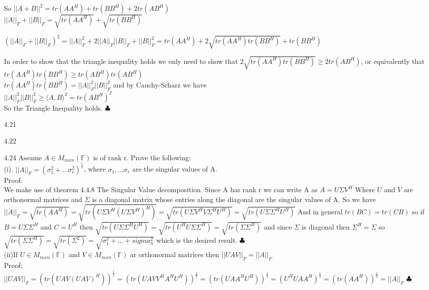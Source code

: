 \documentclass[12pt]{article}
\newenvironment{problems}{\begin{list}{}{\setlength{\labelwidth}{.7in}}}{\end{list}}
\begin{document}
\begin{problems}
So $||A+B||^2 = tr(AA^H) + tr(BB^H) + 2tr(AB^H)$\\

$||A||_F + ||B||_F = \sqrt{tr(AA^H)} + \sqrt{tr(BB^H)}$

$(||A||_F + ||B||_F)^2 = ||A||_F^2 +2||A||_F||B||_F + ||B||_F^2 = tr(AA^H)+ 2\sqrt{tr(AA^H)tr(BB^H)} + tr(BB^H)$ 

In order to show that the triangle inequality holds we only need to show that $2\sqrt{tr(AA^H)tr(BB^H)} \geq 2tr(AB^H) $, or equivalently that $tr(AA^H)tr(BB^H) \geq tr(AB^H)tr(AB^H)$ \\

$tr(AA^H)tr(BB^H) = ||A||_F^2||B||_F^2$ and by Cauchy-Scharz we have\\
$ ||A||_F^2||B||_F^2 \geq \langle A,B\rangle^2 =tr(AB^H)^2$\\

So the Triangle Inequality holds. \hfill $\clubsuit$\\

\item[4.21]

\item[4.22]

\item[4.24]
Assume $A\in M_{mxn}(\mathbb{F})$ is of rank r. Prove the following:\\
(i). $||A||_F = (\sigma_1^2 + ...\sigma_r^2)^{\frac{1}{2}}$, where $\sigma_1,...\sigma_r$ are the singular values of A.\\

Proof:\\
We make use of theorem 4.4.8 The Singular Value decomposition.  Since A has rank r we can write A as $A=U\Sigma V^H$ Where $U$ and $V$ are orthonormal matrices and $\Sigma$ is a diagonal matrix whose entries along the diagonal are the singular values of A. So we have $||A||_F = \sqrt{ tr(AA^H  )   }
 = \sqrt{ tr(U\Sigma V^H    (U\Sigma V^H)^H  )   } = \sqrt{ tr(U\Sigma V^HV\Sigma^HU^H)     }
  = \sqrt{ tr(U\Sigma\Sigma^HU^H)     }$ And in general $tr(BC) = tr(CB)$ so if $B =U\Sigma\Sigma^H$ and $C = U^H$ then $\sqrt{ tr(U\Sigma\Sigma^HU^H)     } = \sqrt{ tr(U^HU\Sigma\Sigma^H)     } = \sqrt{ tr(\Sigma\Sigma^H)     }$ and since $\Sigma$ is diagonal then $\Sigma^H = \Sigma$ so $\sqrt{ tr(\Sigma\Sigma^H)     } = \sqrt{ tr(\Sigma^2)     } = \sqrt{\sigma_1^2 +...+sigma_n^2   }$ which is the desired result. \hfill $\clubsuit$\\
  
(ii)If $U\in M_{mxn}(\mathbb{F})$ and $V\in M_{mxn}(\mathbb{F})$ ar orthonormal matrices then $||UAV||_F =||A||_F$\\
Proof:\\
$||UAV||_F = ( tr(UAV(UAV)^H)        )^{\frac{1}{2}} = ( tr(U A VV^H A^H U^H)        )^{\frac{1}{2}} = 
( tr(U AA^H U^H)        )^{\frac{1}{2}} = (U^H U A A^H   )^{\frac{1}{2}} = (tr(A A^H)   )^{\frac{1}{2}} = ||A||_F$ \hfill $\clubsuit$\\


\end{problems}
\end{document}
